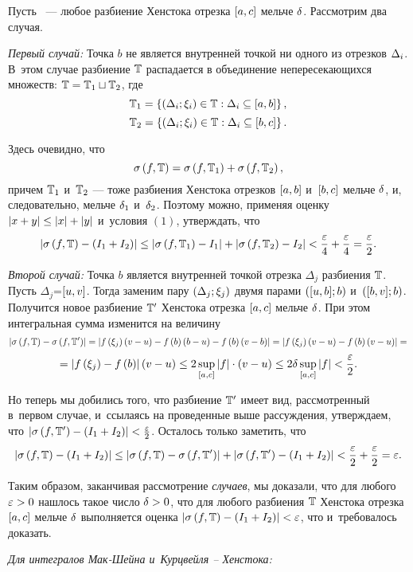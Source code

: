 \documentclass[draft]{article}
\begin{document}
Пусть \Tdixif\ --- любое разбиение Хенстока отрезка $\seg[a,c]$
мельче $\delta$. Рассмотрим два случая.

\eject

{\sl Первый случай:} Точка $b$ не является внутренней точкой ни
одного из отрезков $\Delta_i$. В~этом случае разбиение $\mathbb{T}$ распадается
в объединение непересекающихся множеств: $\mathbb{T}=\mathbb{T}_1\sqcup\mathbb{T}_2$, где
$$\T_1=\set{\dixi\in\T:\dei\subseteq\seg[a,b]},$$
$$\T_2=\set{\dixi\in\T:\dei\subseteq\seg[b,c]}.$$

Здесь очевидно, что $$\isum(f,\T)=\isum(f,\T_1)+\isum(f,\T_2),$$
причем $\mathbb{T}_1$ и~$\mathbb{T}_2$ --- тоже разбиения Хенстока отрезков
$\seg[a,b]$ и~$\seg[b,c]$ мельче $\delta$, и, следовательно, мельче
$\delta_1$ и~$\delta_2$. Поэтому можно, применяя оценку
$\left|x+y\right|\le\left|x\right|+\left|y\right|$ и~условия $\left(1\right)$,
утверждать, что
$$\abs{\isum(f,\T)-\left(I_1+I_2\right)}\le\abs{\isum(f,\T_1)-I_1}+
\abs{\isum(f,\T_2)-I_2}<{\ep\over4}+{\ep\over4}={\ep\over2}.$$

{\sl Второй случай:} Точка $b$ является внутренней точкой отрезка
$\Delta_j$ разбиения $\mathbb{T}$. Пусть $\Delta_j$=$\seg[u,v]$. Тогда
заменим пару $\pair(\Delta_j;\xi_j)$ двумя парами
$\pair(\seg[u,b];b)$ и~$\pair(\seg[b,v];b)$. Получится новое
разбиение $\mathbb{T}'$ Хенстока отрезка $\seg[a,c]$ мельче $\delta$. При этом
интегральная сумма изменится на величину
$$\abs{\isum(f,\T)-\isum(f,\T')}=
\abs{f\at(\xi_j)\at(v-u)-f\at(b)\at(b-u)-f\at(b)\at(v-b)}=
\abs{f\at(\xi_j)\at(v-u)-f\at(b)\at(v-u)}=$$
$$=\abs{f\at(\xi_j)-f\at(b)}\at(v-u)\le
2\sup_{\left[a ,c\right]}\abs{f}\cdot\at(v-u)\le
2\de\sup_{\left[a ,c\right]}\abs{f}<{\ep\over2}.$$

Но теперь мы добились того, что разбиение $\mathbb{T}'$ имеет вид,
рассмотренный в~первом случае, и~ссылаясь на проведенные выше
рассуждения, утверждаем, что
$\abs{\isum(f,\T')-(I_1+I_2)}<{\ep\over2}$. Осталось только
заметить, что $$\abs{\isum(f,\T)-(I_1+I_2)}\le
\abs{\isum(f,\T)-\isum(f,\T')}+\abs{\isum(f,\T')-(I_1+I_2)}<
{\ep\over2}+{\ep\over2}=\ep.$$

Таким образом, заканчивая рассмотрение {\sl случаев}, мы доказали,
что для любого $\varepsilon > 0$ нашлось такое число $\delta > 0$, что для любого
разбиения $\mathbb{T}$ Хенстока отрезка $\seg[a,c]$ мельче $\delta$ выполняется
оценка $\abs{\isum(f,\T)-(I_1+I_2)}<\ep$, что и~требовалось
доказать.

\medskip

{\it Для интегралов Мак-Шейна и~Курцвейля -- Хенстока:}

\smallskip
\end{document}
